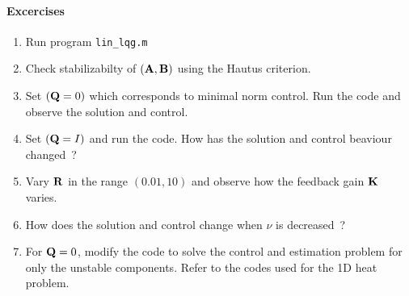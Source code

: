 \documentclass[12pt]{article}
\begin{document}
\paragraph{Excercises}

\begin{enumerate}

\item Run program {\tt lin\_lqg.m}

\item Check stabilizabilty of $({\mathbf A},{\mathbf B})$ using the Hautus criterion.

\item Set $({\mathbf Q} = 0)$ which corresponds to minimal norm control. Run the code and observe the solution and control.

\item Set $({\mathbf Q} = I)$ and run the code. How has the solution and control beaviour changed~?

\item Vary ${\mathbf R}$ in the range $(0.01,10)$ and observe how the feedback gain ${\mathbf K}$ varies.

\item How does the solution and control change when $\nu$ is decreased~?

\item For ${\mathbf Q} = 0$, modify the code to solve the control and estimation problem for only the unstable components. Refer to the codes used for the 1D heat problem.
\end{enumerate}


\end{document}
